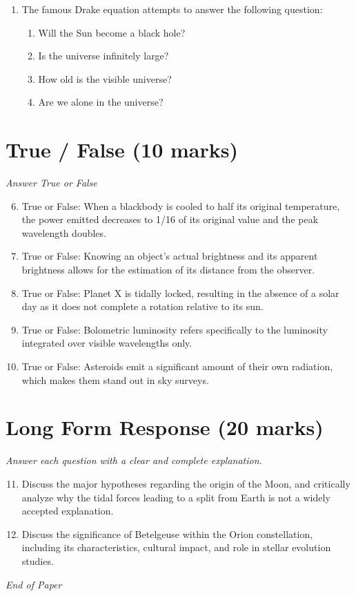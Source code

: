 \documentclass[12pt]{article}
\begin{document}
\begin{enumerate}[label=\arabic*.]
\begin{enumerate}[label=(\alph*)]
    \item the craters on the Moon
    \item asteroids Kuiper-belt comets and the Oort cloud
\end{enumerate}
\item The famous Drake equation attempts to answer the following question:
\begin{enumerate}[label=(\alph*)]
    \item Will the Sun become a black hole?
    \item Is the universe infinitely large?
    \item How old is the visible universe?
    \item Are we alone in the universe?
\end{enumerate}
\end{enumerate}

\section*{True / False (10 marks)}
\textit{Answer True or False}
\begin{enumerate}[label=\arabic*.]
\setcounter{enumi}{5}
\item True or False: When a blackbody is cooled to half its original temperature, the power emitted decreases to 1/16 of its original value and the peak wavelength doubles.
\item True or False: Knowing an object's actual brightness and its apparent brightness allows for the estimation of its distance from the observer.
\item True or False: Planet X is tidally locked, resulting in the absence of a solar day as it does not complete a rotation relative to its sun.
\item True or False: Bolometric luminosity refers specifically to the luminosity integrated over visible wavelengths only.
\item True or False: Asteroids emit a significant amount of their own radiation, which makes them stand out in sky surveys.
\end{enumerate}

\section*{Long Form Response (20 marks)}
\textit{Answer each question with a clear and complete explanation.}
\begin{enumerate}[label=\arabic*.]
\setcounter{enumi}{10}
\item Discuss the major hypotheses regarding the origin of the Moon, and critically analyze why the tidal forces leading to a split from Earth is not a widely accepted explanation.
\item Discuss the significance of Betelgeuse within the Orion constellation, including its characteristics, cultural impact, and role in stellar evolution studies.
\end{enumerate}

\vfill
\noindent\textit{End of Paper}
\end{document}
